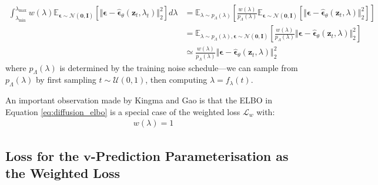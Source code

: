 \documentclass[ oneside,%
                    author={George Herbert},
                    degree={MSci},
                     title={Video Diffusion Models for Climate Simulations},
                  subtitle={}]{dissertation}
\begin{document}
\begin{align}
      \int_{\lambda_{\min}}^{\lambda_{\max}}w(\lambda)\mathbb{E}_{\boldsymbol\epsilon\sim\mathcal{N}(\mathbf{0},\mathbf{I})}\left[\Vert\boldsymbol\epsilon-\hat{\boldsymbol\epsilon}_\theta(\mathbf{z}_t,\lambda_t)\Vert_2^2\right]d\lambda&=\mathbb{E}_{\lambda\sim p_\Lambda(\lambda)}\left[\frac{w(\lambda)}{p_\Lambda(\lambda)}\mathbb{E}_{\boldsymbol\epsilon\sim\mathcal{N}(\mathbf{0},\mathbf{I})}\left[\Vert\boldsymbol\epsilon - \hat{\boldsymbol\epsilon}_\theta(\mathbf{z}_t, \lambda)\Vert_2^2 \right]\right]\\
      &=\mathbb{E}_{\lambda\sim p_\Lambda(\lambda),\boldsymbol\epsilon\sim\mathcal{N}(\mathbf{0}, \mathbf{I})}\left[\frac{w(\lambda)}{p_\Lambda(\lambda)}\Vert \boldsymbol\epsilon-\hat{\boldsymbol\epsilon}_\theta(\mathbf{z}_t,\lambda)\Vert_2^2\right]\\
      &\simeq \frac{w(\lambda)}{p_\Lambda(\lambda)}\Vert \boldsymbol\epsilon-\hat{\boldsymbol\epsilon}_\theta(\mathbf{z}_t,\lambda)\Vert_2^2
\end{align}
where $p_\Lambda(\lambda)$ is determined by the training noise schedule---we can sample from $p_\Lambda(\lambda)$ by first sampling $t\sim\mathcal{U}(0, 1)$, then computing $\lambda=f_\lambda(t)$. 

An important observation made by Kingma and Gao \cite{Understanding_Diffusion_Objective_Kingma} is that the ELBO in Equation \ref{eq:diffusion_elbo} is a special case of the weighted loss $\mathcal{L}_w$ with:
\begin{align}
      w(\lambda) = 1
\end{align}

\subsection{Loss for the $\mathbf{v}$-Prediction Parameterisation as the Weighted Loss}
\label{sec:background_diffusion_v_weighted_loss}
\end{document}
